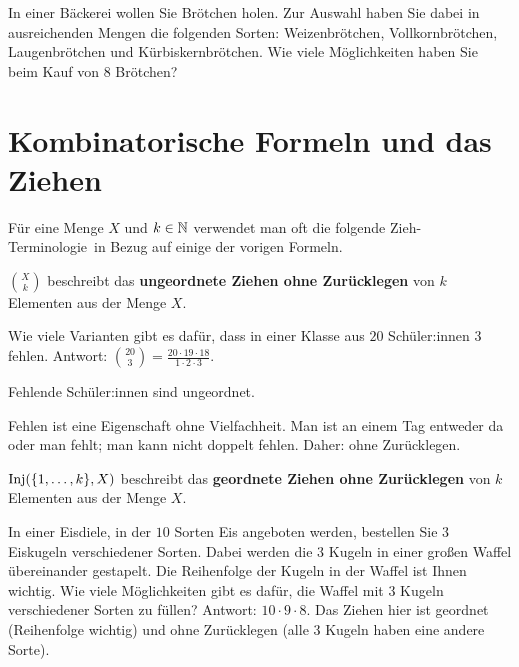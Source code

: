 \begin{aufg}
	In einer Bäckerei wollen Sie Brötchen holen. Zur Auswahl haben Sie dabei in ausreichenden Mengen die folgenden Sorten: Weizenbrötchen, Vollkornbrötchen, Laugenbrötchen und Kürbiskern\-brötchen. Wie viele Möglichkeiten haben Sie beim Kauf von $8$ Brötchen? 
\end{aufg} 

\section{Kombinatorische Formeln und das Ziehen}

\begin{bem}
	Für eine Menge $X$ und $k \in \mathbb{N}$ verwendet man oft die folgende \glqq Zieh-Terminologie\grqq\ in Bezug auf einige der vorigen Formeln. 
\end{bem}

\begin{bem} $\binom{X}{k}$ beschreibt das \textbf{ungeordnete Ziehen ohne Zurücklegen} von $k$ Elementen aus der Menge $X$.  
\end{bem}

\begin{bsp}
Wie viele Varianten gibt es dafür, dass in einer Klasse aus $20$ Schüler:innen $3$ fehlen. Antwort: $\binom{20}{3} = \frac{20 \cdot 19 \cdot 18}{1 \cdot 2 \cdot 3}$.

Fehlende Schüler:innen sind ungeordnet. 

Fehlen ist eine Eigenschaft ohne Vielfachheit. Man ist an einem Tag entweder da oder man fehlt; man kann  nicht doppelt fehlen. Daher: ohne Zurücklegen. 
\end{bsp} 

\begin{bem} $\operatorname{Inj}(\{1,\ldots,k\},X)$ beschreibt das \textbf{geordnete Ziehen ohne Zurücklegen} von $k$ Elementen aus der Menge $X$. 
\end{bem}

\begin{bsp}
In einer Eisdiele, in der $10$ Sorten Eis angeboten werden, bestellen Sie $3$ Eiskugeln verschiedener Sorten. Dabei werden die $3$ Kugeln in einer großen Waffel übereinander gestapelt. Die Reihenfolge der Kugeln in der Waffel ist Ihnen wichtig. Wie viele Möglichkeiten gibt es dafür, die Waffel mit $3$ Kugeln verschiedener Sorten zu füllen? Antwort: $10 \cdot 9 \cdot 8$. Das Ziehen hier ist geordnet (Reihenfolge wichtig) und ohne Zurücklegen (alle $3$ Kugeln haben eine andere Sorte). 
\end{bsp} 


